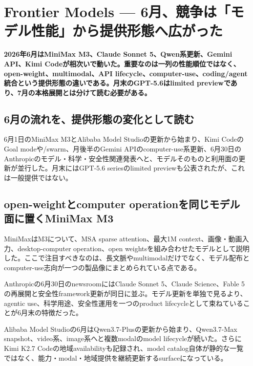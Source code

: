 \section{Frontier Models — 6月、競争は「モデル性能」から提供形態へ広がった}
\noindent\textbf{2026年6月はMiniMax M3、Claude Sonnet 5、Qwen系更新、Gemini API、Kimi Codeが相次いで動いた。重要なのは一列の性能順位ではなく、open-weight、multimodal、API lifecycle、computer-use、coding/agent統合という提供形態の違いである。月末のGPT-5.6はlimited previewであり、7月の本格展開とは分けて読む必要がある。}\autocite{src-9191d43918fc,src-a24fd97eb3d0,src-d8e13386974c,src-eac8dfbeb78c,src-f6aa679babd7}

\subsection{6月の流れを、提供形態の変化として読む}

6月1日のMiniMax M3とAlibaba Model Studioの更新から始まり、Kimi CodeのGoal modeや/swarm、月後半のGemini APIのcomputer-use系更新、6月30日のAnthropicのモデル・科学・安全性関連発表へと、モデルそのものと利用面の更新が並行した。月末にはGPT-5.6 seriesのlimited previewも公表されたが、これは一般提供ではない。\autocite{src-30f48121decc,src-9191d43918fc,src-a24fd97eb3d0,src-d8e13386974c,src-eac8dfbeb78c,src-f6aa679babd7}


\subsection{open-weightとcomputer operationを同じモデル面に置くMiniMax M3}

MiniMaxはM3について、MSA sparse attention、最大1M context、画像・動画入力、desktop-computer operation、open weightsを組み合わせたモデルとして説明した。ここで注目すべきなのは、長文脈やmultimodalだけでなく、モデル配布とcomputer-use志向が一つの製品像にまとめられている点である。\autocite{src-d8e13386974c}


Anthropicの6月30日のnewsroomにはClaude Sonnet 5、Claude Science、Fable 5の再展開と安全性framework更新が同日に並ぶ。モデル更新を単独で見るより、agentic use、科学用途、安全性運用を一つのproduct lifecycleとして束ねていることが6月末の特徴だった。\autocite{src-f6aa679babd7}


Alibaba Model Studioの6月はQwen3.7-Plusの更新から始まり、Qwen3.7-Max snapshot、video系、image系へと複数modalのmodel lifecycleが続いた。さらにKimi K2.7 Codeの地域availabilityも記録され、model catalog自体が静的な一覧ではなく、能力・modal・地域提供を継続更新するsurfaceになっている。\autocite{src-eac8dfbeb78c}


